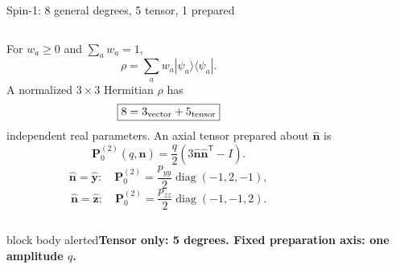 \documentclass[aspectratio=169,11pt]{beamer}
\newcommand{\vct}[1]{\bm{#1}}
\newcommand{\Tens}{\bm P^{(2)}}
\newcommand{\conclusion}[1]{\begin{beamercolorbox}[rounded=true,sep=0.55em,wd=\textwidth]{block body alerted}\centering\bfseries\color{Navy}#1\end{beamercolorbox}}
\begin{document}
\begin{frame}{Spin-1: 8 general degrees, 5 tensor, 1 prepared}
  \begin{columns}[T,onlytextwidth]
      For $w_a\geq0$ and $\sum_a w_a=1$,
      \[
        \rho=\sum_a w_a|\psi_a\rangle\langle\psi_a|.
      \]
      A normalized $3\times3$ Hermitian $\rho$ has
      \[
        \boxed{8=3_{\rm vector}+5_{\rm tensor}}
      \]
      independent real parameters.
      An axial tensor prepared about $\hat{\vct n}$ is
      \[
        \Tens_0(q,\hat{\vct n})
        =\frac q2\left(3\hat{\vct n}\hat{\vct n}^{\mathsf T}-I\right).
      \]
      \[
        \hat{\vct n}=\hat{\vct y}:
        \quad \Tens_0=\frac{p_{yy}}2\operatorname{diag}(-1,2,-1),
      \]
      \vspace{-0.45em}
      \[
        \hat{\vct n}=\hat{\vct z}:
        \quad \Tens_0=\frac{p_{zz}}2\operatorname{diag}(-1,-1,2).
      \]
  \end{columns}

  \vspace{0.45em}
  \conclusion{Tensor only: 5 degrees. Fixed preparation axis: one amplitude $q$.}
\end{frame}
\end{document}
